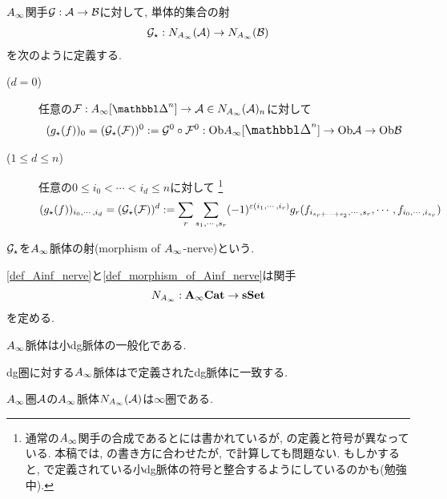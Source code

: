 \documentclass[uplatex, a4paper, 14Q, dvipdfmx]{jsarticle}
\begin{document}
\begin{definition} \label{def_morphism_of_Ainf_nerve}
  $A_{\infty}$関手$\mathcal{G} : \mathcal{A} \to \mathcal{B}$に対して, 単体的集合の射
  \begin{align*}
    \mathcal{G}_\star : N_{A_{\infty}}(\mathcal{A}) \to N_{A_{\infty}}(\mathcal{B})
  \end{align*}
  を次のように定義する. 
  \begin{description}
    \item[($d=0$)] 任意の$\F : \Ainf[\Prism^n] \to \A \in N_{\Ainf}(\A)_n$に対して 
    \begin{align*}
      (g_\star(f))_0 = (\G_\star(\F))^0 := \G^0 \circ \F^0 : \Ob\Ainf[\Prism^n] \to \Ob\A \to \Ob\B
    \end{align*}
    \item[($1 \leq d \leq n$)] 任意の$0 \leq i_0 < \cdots < i_d \leq n$に対して
    \footnote{
      通常の$A_{\infty}$関手の合成であると\cite{Fao}には書かれているが, \cite{Sei}の定義と符号が異なっている. 
      本稿では, \cite{Fao}の書き方に合わせたが, \cite{Sei}で計算しても問題ない.
      もしかすると, \cite{Lurie08}で定義されている小dg脈体の符号と整合するようにしているのかも(勉強中).  
    } 
    \begin{align*}
      (g_\star (f))_{i_0,\cdots,i_d} = (\mathcal{G}_\star(\mathcal{F}))^d := \sum_r \sum_{s_1,\cdots,s_r} (-1)^{\varepsilon(i_1,\cdots,i_r)} g_r(f_{i_{s_r+\cdots+s_2},\cdots,s_r}, \cdots, f_{i_0,\cdots,i_{s_r}})
    \end{align*}
  \end{description}
  $\mathcal{G}_\star$を$A_{\infty}$脈体の射(morphism of $A_{\infty}$-nerve)という. 
\end{definition}

\begin{lemma}
  \cref{def_Ainf_nerve}と\cref{def_morphism_of_Ainf_nerve}は関手
  \begin{align*}
    N_{A_{\infty}} : \mathbf{A}_\infty\mathbf{Cat} \to \mathbf{sSet}
  \end{align*}
  を定める. 
\end{lemma}

$A_{\infty}$脈体は小dg脈体の一般化である. 

\begin{remark}
  dg圏に対する$A_{\infty}$脈体は\cite{Lurie08}で定義されたdg脈体に一致する.
\end{remark}

\begin{theorem}
  $A_{\infty}$圏$\mathcal{A}$の$A_{\infty}$脈体$N_{A_{\infty}}(\mathcal{A})$は$\infty$圏である. 
\end{theorem}
\end{document}
